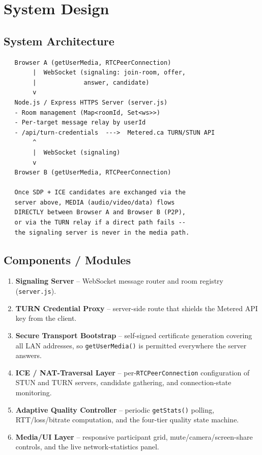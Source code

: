 \documentclass[12pt,a4paper]{report}
\begin{document}
\chapter{System Design}

\section{System Architecture}
\begin{center}
\begin{minipage}{0.85\textwidth}
\begin{verbatim}
   Browser A (getUserMedia, RTCPeerConnection)
        |  WebSocket (signaling: join-room, offer,
        |             answer, candidate)
        v
   Node.js / Express HTTPS Server (server.js)
   - Room management (Map<roomId, Set<ws>>)
   - Per-target message relay by userId
   - /api/turn-credentials  --->  Metered.ca TURN/STUN API
        ^
        |  WebSocket (signaling)
        v
   Browser B (getUserMedia, RTCPeerConnection)

   Once SDP + ICE candidates are exchanged via the
   server above, MEDIA (audio/video/data) flows
   DIRECTLY between Browser A and Browser B (P2P),
   or via the TURN relay if a direct path fails --
   the signaling server is never in the media path.
\end{verbatim}
\end{minipage}
\end{center}

\section{Components / Modules}
\begin{enumerate}[nosep]
  \item \textbf{Signaling Server} -- WebSocket message router and room registry
  (\texttt{server.js}).
  \item \textbf{TURN Credential Proxy} -- server-side route that shields the Metered API
  key from the client.
  \item \textbf{Secure Transport Bootstrap} -- self-signed certificate generation covering
  all LAN addresses, so \texttt{getUserMedia()} is permitted everywhere the server answers.
  \item \textbf{ICE / NAT-Traversal Layer} -- per-\texttt{RTCPeerConnection} configuration
  of STUN and TURN servers, candidate gathering, and connection-state monitoring.
  \item \textbf{Adaptive Quality Controller} -- periodic \texttt{getStats()} polling,
  RTT/loss/bitrate computation, and the four-tier quality state machine.
  \item \textbf{Media/UI Layer} -- responsive participant grid, mute/camera/screen-share
  controls, and the live network-statistics panel.
\end{enumerate}
\end{document}
